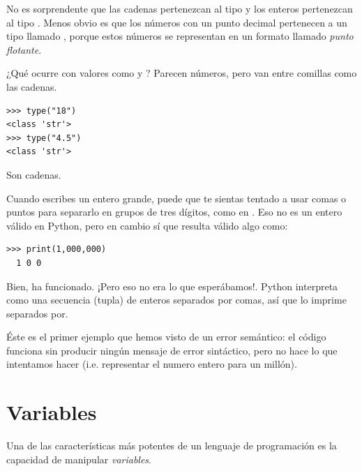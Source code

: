 No es sorprendente que las cadenas pertenezcan al tipo  y los enteros pertenezcan al tipo . Menos obvio es que los números con un punto decimal pertenecen a un tipo llamado , porque estos números se representan en un formato llamado \emph{punto flotante}.

   
  


¿Qué ocurre con valores como  y ? Parecen números, pero van
entre comillas como las cadenas.

\begin{Verbatim}[frame=single]
>>> type("18")
<class 'str'>
>>> type("4.5")
<class 'str'>
\end{Verbatim}

Son cadenas.

Cuando escribes un entero grande, puede que te sientas tentado a usar
comas o puntos para separarlo en grupos de tres dígitos, como en
. Eso no es un entero válido en Python,
pero en cambio sí que resulta válido algo como:

\begin{Verbatim}[frame=single]
>>> print(1,000,000)
  1 0 0
\end{Verbatim}

Bien, ha funcionado. ¡Pero eso no era lo que esperábamos!. Python interpreta  como una secuencia (tupla)
de enteros separados por comas, así que  lo imprime separados por.

 

Éste es el primer ejemplo que hemos visto de un error semántico: el
código funciona sin producir ningún mensaje de error sintáctico, pero no hace lo que intentamos hacer (i.e. representar el numero entero para un millón).

\hypertarget{variables}{%
\section{Variables}\label{variables}}

 

Una de las características más potentes de un lenguaje de programación
es la capacidad de manipular \emph{variables}. 

